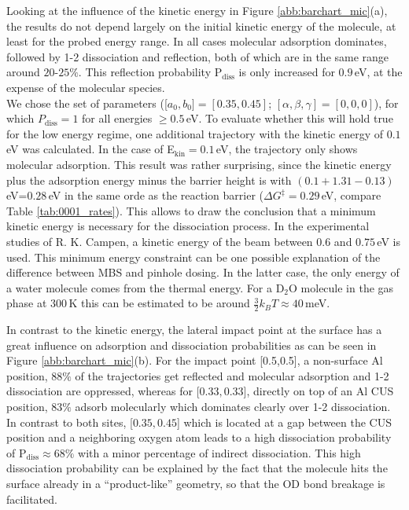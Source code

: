 \documentclass[11pt,DIV=13,BCOR=5mm,a4paper,headinclude]{scrbook}
\begin{document}
Looking at the influence of the kinetic energy in Figure \ref{abb:barchart_mic}(a), the results do not depend largely on the initial kinetic energy of the molecule, at least for the probed energy range.
In all cases molecular adsorption dominates, followed by 1-2 dissociation and reflection, both of which are in the same range around $20$-$25\%$.
This reflection probability P$_\textrm{diss}$ is only increased for $0.9\,$eV, at the expense of the molecular species.\\
We chose the set of parameters ([$a_0,b_0]=[0.35,0.45]$; $[\alpha,\beta,\gamma]=[0,0,0]$), for which $P_\textrm{diss}=1$ for all energies $\geq 0.5\,$eV.
To evaluate whether this will hold true for the low energy regime, one additional trajectory with the kinetic energy of $0.1\,$eV was calculated.
In the case of E$_\textrm{kin}=0.1\,$eV, the trajectory only shows molecular adsorption.
This result was rather surprising, since the kinetic energy plus the adsorption energy minus the barrier height is with $(0.1+1.31-0.13)\,$eV=$0.28\,$eV in the same orde as the reaction barrier ($\Delta G^\ddagger=0.29\,$eV, compare Table \ref{tab:0001_rates}).
This allows to draw the conclusion that a minimum kinetic energy is necessary for the dissociation process.
In the experimental studies of R. K. Campen, a kinetic energy of the beam between $0.6$ and $0.75\,$eV is used.
This minimum energy constraint can be one possible explanation of the difference between MBS and pinhole dosing.
In the latter case, the only energy of a water molecule comes from the thermal energy.
For a D$_2$O molecule in the gas phase at $300\,$K this can be estimated to be around $\frac{3}{2}k_BT\approx40\,$meV.


In contrast to the kinetic energy, the lateral impact point at the surface has a great influence on adsorption and dissociation probabilities as can be seen in Figure \ref{abb:barchart_mic}(b).
For the impact point [0.5,0.5], a non-surface Al position, $88\%$ of the trajectories get reflected and molecular adsorption and 1-2 dissociation are oppressed, whereas for [$0.33,0.33$], directly on top of an Al CUS position, $83\%$ adsorb molecularly which dominates clearly over 1-2 dissociation.
In contrast to both sites, [$0.35,0.45$] which is located at a gap between the CUS position and a neighboring oxygen atom leads to a high dissociation probability of P$_\textrm{diss}\approx 68\%$ with a minor percentage of indirect dissociation.
This high dissociation probability can be explained by the fact that the molecule hits the surface already in a ``product-like'' geometry, so that the OD bond breakage is facilitated.
\end{document}
